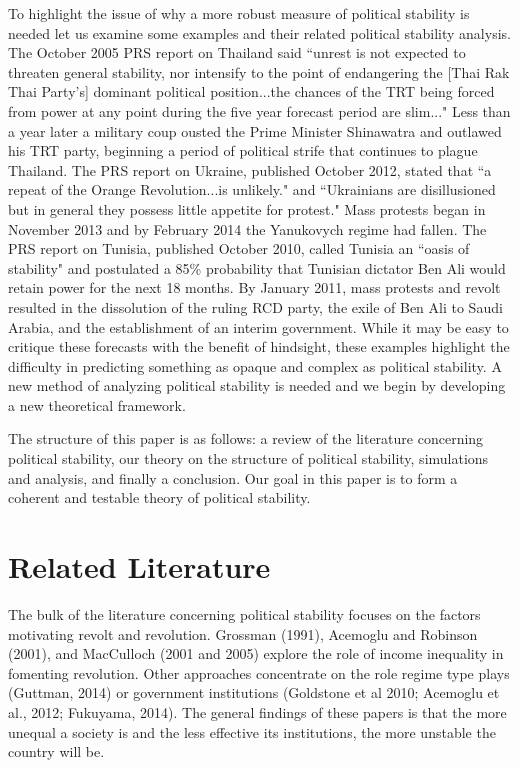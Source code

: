 \documentclass[12pt]{article}
\begin{document}
\begin{spacing}{1.5}
To highlight the issue of why a more robust measure of political stability is needed let us examine some examples and their related political stability analysis. The October 2005 PRS report on Thailand said ``unrest is not expected to threaten general stability, nor intensify to the point of endangering the [Thai Rak Thai Party's] dominant political position...the chances of the TRT being forced from power at any point during the five year forecast period are slim..." Less than a year later a military coup ousted the Prime Minister Shinawatra and outlawed his TRT party, beginning a period of political strife that continues to plague Thailand. The PRS report on Ukraine, published October 2012, stated that ``a repeat of the Orange Revolution...is unlikely." and ``Ukrainians are disillusioned but in general they possess little appetite for protest." Mass protests began in November 2013 and by February 2014 the Yanukovych regime had fallen. The PRS report on Tunisia, published October 2010, called Tunisia an ``oasis of stability" and postulated a 85\% probability that Tunisian dictator Ben Ali would retain power for the next 18 months. By January 2011, mass protests and revolt resulted in the dissolution of the ruling RCD party, the exile of Ben Ali to Saudi Arabia, and the establishment of an interim government. While it may be easy to critique these forecasts with the benefit of hindsight, these examples highlight the difficulty in predicting something as opaque and complex as political stability. A new method of analyzing political stability is needed and we begin by developing a new theoretical framework. 

The structure of this paper is as follows: a review of the literature concerning political stability, our theory on the structure of political stability, simulations and analysis, and finally a conclusion. Our goal in this paper is to form a coherent and testable theory of political stability.   


\section{Related Literature}

The bulk of the literature concerning political stability focuses on the factors motivating revolt and revolution. Grossman (1991), Acemoglu and Robinson (2001), and MacCulloch (2001 and 2005) explore the role of income inequality in fomenting revolution. Other approaches concentrate on the role regime type plays (Guttman, 2014) or government institutions (Goldstone et al 2010; Acemoglu et al., 2012; Fukuyama, 2014). The general findings of these papers is that the more unequal a society is and the less effective its institutions, the more unstable the country will be. 


\end{spacing}
\end{document}
